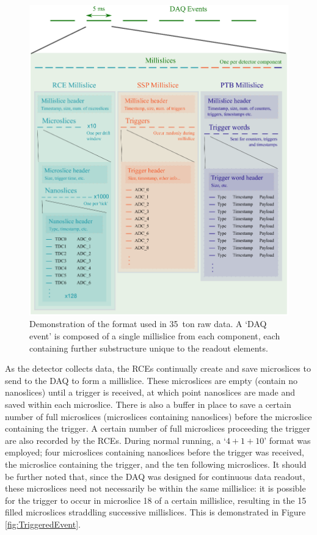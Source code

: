 \begin{figure}[p]
  \centering
  \includegraphics[width=14cm]{data_format.eps}
  \caption[35~ton data format]{Demonstration of the format used in 35~ton raw data.  A `DAQ event' is composed of a single millislice from each component, each containing further substructure unique to the readout elements.}
  \label{fig:DataFormat}
\end{figure}

As the detector collects data, the RCEs continually create and save microslices to send to the DAQ to form a millislice.  These microslices are empty (contain no nanoslices) until a trigger is received, at which point nanoslices are made and saved within each microslice.  There is also a buffer in place to save a certain number of full microslices (microslices containing nanoslices) before the microslice containing the trigger.  A certain number of full microslices proceeding the trigger are also recorded by the RCEs.  During normal running, a `$4+1+10$' format was employed; four microslices containing nanoslices before the trigger was received, the microslice containing the trigger, and the ten following microslices.  It should be further noted that, since the DAQ was designed for continuous data readout, these microslices need not necessarily be within the same millislice: it is possible for the trigger to occur in microslice 18 of a certain millislice, resulting in the 15 filled microslices straddling successive millislices.  This is demonstrated in Figure \ref{fig:TriggeredEvent}.

